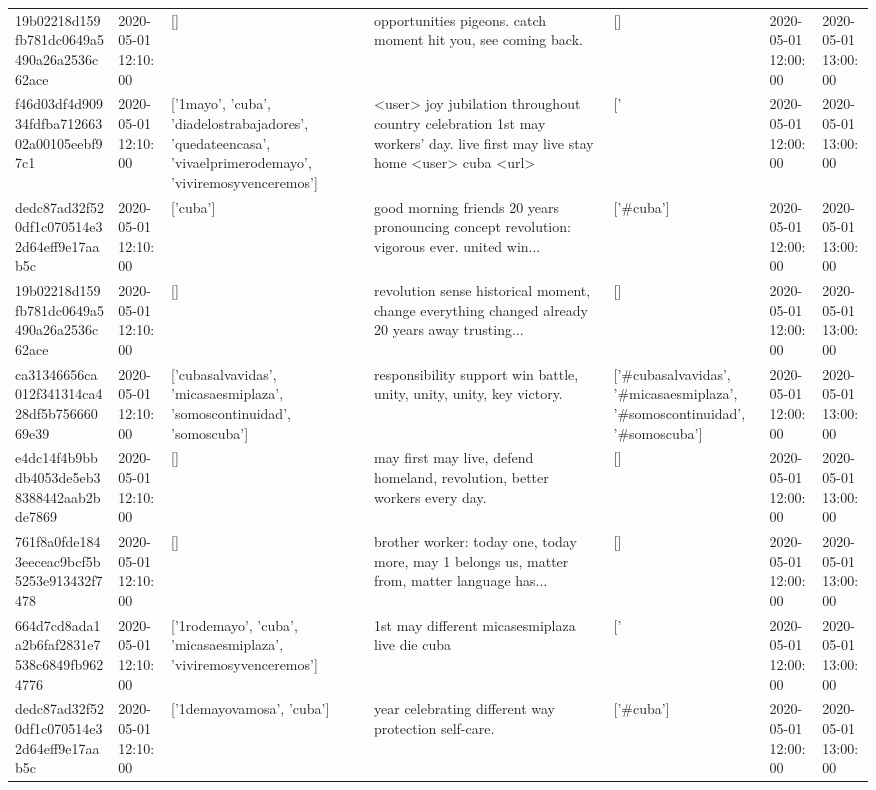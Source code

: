 \begin{tabular}{lllllll}
19b02218d159fb781dc0649a5490a26a2536c62ace & 2020-05-01 12:10:00 & [] & opportunities pigeons. catch moment hit you, see coming back. & [] & 2020-05-01 12:00:00 & 2020-05-01 13:00:00 \\
f46d03df4d90934fdfba71266302a00105eebf97c1 & 2020-05-01 12:10:00 & ['1mayo', 'cuba', 'diadelostrabajadores', 'quedateencasa', 'vivaelprimerodemayo', 'viviremosyvenceremos'] & <user> joy jubilation throughout country celebration 1st may workers' day. live first may live stay home <user> cuba <url> & ['#1mayo', '#cuba', '#diadelostrabajadores', '#quedateencasa', '#vivaelprimerodemayo', '#viviremosyvenceremos'] & 2020-05-01 12:00:00 & 2020-05-01 13:00:00 \\
dedc87ad32f520df1c070514e32d64eff9e17aab5c & 2020-05-01 12:10:00 & ['cuba'] & good morning friends 20 years pronouncing concept revolution: vigorous ever. united win... & ['#cuba'] & 2020-05-01 12:00:00 & 2020-05-01 13:00:00 \\
19b02218d159fb781dc0649a5490a26a2536c62ace & 2020-05-01 12:10:00 & [] & revolution sense historical moment, change everything changed already 20 years away trusting... & [] & 2020-05-01 12:00:00 & 2020-05-01 13:00:00 \\
ca31346656ca012f341314ca428df5b75666069e39 & 2020-05-01 12:10:00 & ['cubasalvavidas', 'micasaesmiplaza', 'somoscontinuidad', 'somoscuba'] & responsibility support win battle, unity, unity, unity, key victory. & ['#cubasalvavidas', '#micasaesmiplaza', '#somoscontinuidad', '#somoscuba'] & 2020-05-01 12:00:00 & 2020-05-01 13:00:00 \\
e4dc14f4b9bbdb4053de5eb38388442aab2bde7869 & 2020-05-01 12:10:00 & [] & may first may live, defend homeland, revolution, better workers every day. & [] & 2020-05-01 12:00:00 & 2020-05-01 13:00:00 \\
761f8a0fde1843eeceac9bcf5b5253e913432f7478 & 2020-05-01 12:10:00 & [] & brother worker: today one, today more, may 1 belongs us, matter from, matter language has... & [] & 2020-05-01 12:00:00 & 2020-05-01 13:00:00 \\
664d7cd8ada1a2b6faf2831e7538c6849fb9624776 & 2020-05-01 12:10:00 & ['1rodemayo', 'cuba', 'micasaesmiplaza', 'viviremosyvenceremos'] & 1st may different micasesmiplaza live die cuba & ['#1rodemayo', '#cuba', '#micasaesmiplaza', '#viviremosyvenceremos'] & 2020-05-01 12:00:00 & 2020-05-01 13:00:00 \\
dedc87ad32f520df1c070514e32d64eff9e17aab5c & 2020-05-01 12:10:00 & ['1demayovamosa', 'cuba'] & year celebrating different way protection self-care. & ['#cuba'] & 2020-05-01 12:00:00 & 2020-05-01 13:00:00 \\

\end{tabular}
